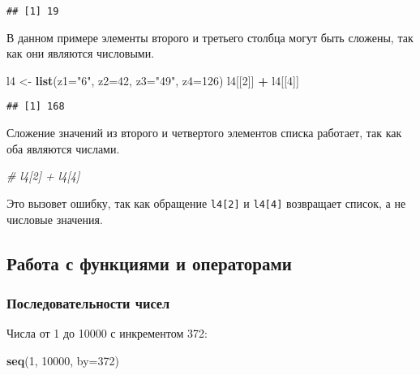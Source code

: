 \documentclass[
]{article}
\newenvironment{Shaded}{\begin{snugshade}}{\end{snugshade}}
\newcommand{\AttributeTok}[1]{\textcolor[rgb]{0.13,0.29,0.53}{#1}}
\newcommand{\CommentTok}[1]{\textcolor[rgb]{0.56,0.35,0.01}{\textit{#1}}}
\newcommand{\DecValTok}[1]{\textcolor[rgb]{0.00,0.00,0.81}{#1}}
\newcommand{\FunctionTok}[1]{\textcolor[rgb]{0.13,0.29,0.53}{\textbf{#1}}}
\newcommand{\NormalTok}[1]{#1}
\newcommand{\OtherTok}[1]{\textcolor[rgb]{0.56,0.35,0.01}{#1}}
\newcommand{\SpecialCharTok}[1]{\textcolor[rgb]{0.81,0.36,0.00}{\textbf{#1}}}
\newcommand{\StringTok}[1]{\textcolor[rgb]{0.31,0.60,0.02}{#1}}
\begin{document}
\begin{verbatim}
## [1] 19
\end{verbatim}

В данном примере элементы второго и третьего столбца могут быть сложены,
так как они являются числовыми.

\begin{Shaded}
\begin{Highlighting}[]
\NormalTok{l4 }\OtherTok{\textless{}{-}} \FunctionTok{list}\NormalTok{(}\AttributeTok{z1=}\StringTok{"6"}\NormalTok{, }\AttributeTok{z2=}\DecValTok{42}\NormalTok{, }\AttributeTok{z3=}\StringTok{"49"}\NormalTok{, }\AttributeTok{z4=}\DecValTok{126}\NormalTok{)}
\NormalTok{l4[[}\DecValTok{2}\NormalTok{]] }\SpecialCharTok{+}\NormalTok{ l4[[}\DecValTok{4}\NormalTok{]]}
\end{Highlighting}
\end{Shaded}

\begin{verbatim}
## [1] 168
\end{verbatim}

Сложение значений из второго и четвертого элементов списка работает, так
как оба являются числами.

\begin{Shaded}
\begin{Highlighting}[]
\CommentTok{\# l4[2] + l4[4]}
\end{Highlighting}
\end{Shaded}

Это вызовет ошибку, так как обращение \texttt{l4{[}2{]}} и
\texttt{l4{[}4{]}} возвращает список, а не числовые значения.

\subsection{Работа с функциями и
операторами}\label{ux440ux430ux431ux43eux442ux430-ux441-ux444ux443ux43dux43aux446ux438ux44fux43cux438-ux438-ux43eux43fux435ux440ux430ux442ux43eux440ux430ux43cux438}

\subsubsection{Последовательности
чисел}\label{ux43fux43eux441ux43bux435ux434ux43eux432ux430ux442ux435ux43bux44cux43dux43eux441ux442ux438-ux447ux438ux441ux435ux43b}

Числа от 1 до 10000 с инкрементом 372:

\begin{Shaded}
\begin{Highlighting}[]
\FunctionTok{seq}\NormalTok{(}\DecValTok{1}\NormalTok{, }\DecValTok{10000}\NormalTok{, }\AttributeTok{by=}\DecValTok{372}\NormalTok{)}
\end{Highlighting}
\end{Shaded}
\end{document}
